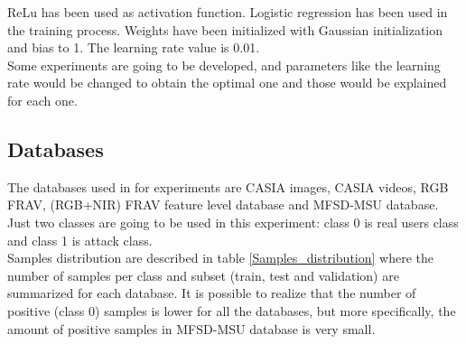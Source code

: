 ReLu has been used as activation function. Logistic regression has been used in the training process. Weights have been initialized with Gaussian initialization and bias to 1. The learning rate value is 0.01.\\

Some experiments are going to be developed, and parameters like the learning rate would be changed to obtain the optimal one and those would be explained for each one.\\

\subsection{Databases} \label{subssec:ejec1_database}
The databases used in for experiments are CASIA images, CASIA videos, RGB FRAV, (RGB+NIR) FRAV feature level database and MFSD-MSU database. Just two classes are going to be used in this experiment: class 0 is real users class and class 1 is attack class.\\

Samples distribution are described in table \ref{Samples_distribution} where the number of samples per class and  subset (train, test and validation) are summarized for each database. It is possible to realize that the number of positive (class 0) samples is lower for all the databases, but more specifically, the amount of positive samples in MFSD-MSU database is very small.\\

